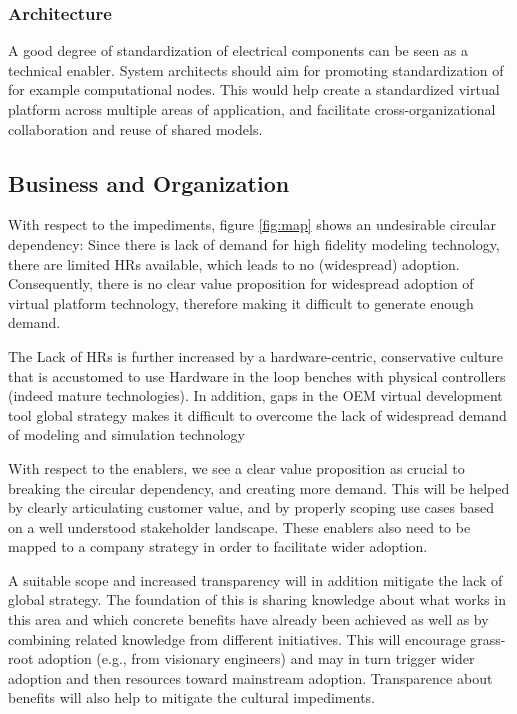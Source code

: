 \subsubsection{Architecture}
A good degree of standardization of electrical components can be seen as a technical enabler. System architects should aim for promoting standardization of for example computational nodes.%
This would help create a standardized virtual platform across multiple areas of application, and  facilitate cross-organizational collaboration and reuse of shared models.



\subsection{Business and Organization}
With respect to the impediments, figure \ref{fig:map} shows an undesirable circular dependency: Since there is lack of demand for high fidelity modeling technology, there are limited HRs available, which leads to no (widespread) adoption. Consequently, there is no clear value proposition for widespread adoption of virtual platform technology, therefore making it difficult to generate enough demand.

The Lack of HRs is further increased by a hardware-centric, conservative culture that is accustomed to use Hardware in the loop benches with physical controllers (indeed mature technologies). In addition, gaps in the OEM virtual development tool global strategy makes it difficult to overcome the lack of widespread demand of modeling and simulation technology

With respect to the enablers, we see a clear value proposition as crucial to breaking the circular dependency, and creating more demand. This will be helped by clearly articulating customer value, and by properly scoping use cases based on a well understood stakeholder landscape. These enablers also need to be mapped to a company strategy in order to facilitate wider adoption. 

A suitable scope and increased transparency will in addition mitigate the lack of global strategy. The foundation of this is sharing knowledge about what works in this area and which concrete benefits have already been achieved as well as by combining related knowledge from different initiatives. This will encourage grass-root adoption (e.g., from visionary engineers) and may in turn trigger wider adoption and then resources toward mainstream adoption. Transparence about benefits will also help to mitigate the cultural impediments.


